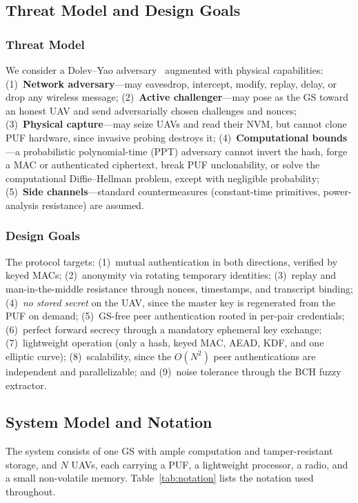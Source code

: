 \documentclass[11pt,a4paper]{article}
\begin{document}
\subsection{Threat Model and Design Goals}

\subsubsection{Threat Model}
We consider a Dolev--Yao adversary~\cite{dolev_yao} augmented with physical
capabilities: (1)~\textbf{Network adversary}---may eavesdrop, intercept,
modify, replay, delay, or drop any wireless message; (2)~\textbf{Active
challenger}---may pose as the GS toward an honest UAV and send
adversarially chosen challenges and nonces; (3)~\textbf{Physical
capture}---may seize UAVs and read their NVM, but cannot clone PUF hardware,
since invasive probing destroys it; (4)~\textbf{Computational bounds}---a
probabilistic polynomial-time (PPT) adversary cannot invert the hash, forge a
MAC or authenticated ciphertext, break PUF unclonability, or solve the
computational Diffie--Hellman problem, except with negligible probability;
(5)~\textbf{Side channels}---standard countermeasures (constant-time
primitives, power-analysis resistance) are assumed.

\subsubsection{Design Goals}
The protocol targets: (1)~mutual authentication in both directions, verified by
keyed MACs; (2)~anonymity via rotating temporary identities;
(3)~replay and man-in-the-middle resistance through nonces, timestamps, and
transcript binding; (4)~\emph{no stored secret} on the UAV, since the master
key is regenerated from the PUF on demand; (5)~GS-free peer authentication
rooted in per-pair credentials; (6)~perfect forward secrecy through a mandatory
ephemeral key exchange; (7)~lightweight operation (only a hash, keyed MAC,
AEAD, KDF, and one elliptic curve); (8)~scalability, since the $O(N^2)$ peer
authentications are independent and parallelizable; and (9)~noise tolerance
through the BCH fuzzy extractor.

\subsection{System Model and Notation}

The system consists of one GS with ample computation and tamper-resistant
storage, and $N$ UAVs, each carrying a PUF, a lightweight processor, a radio,
and a small non-volatile memory. Table~\ref{tab:notation} lists the notation
used throughout.
\end{document}
